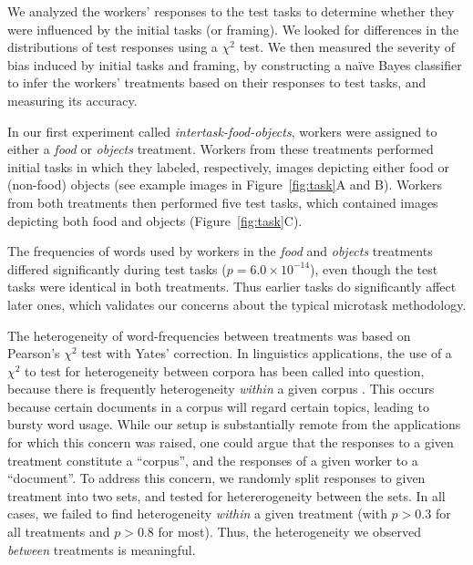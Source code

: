 \documentclass{sigchi}
\begin{document}
We analyzed the
workers' responses to the test tasks to determine whether
they were influenced by the initial tasks (or framing).  We looked for 
differences in the distributions of test responses 
using a $\chi^2$ test.  We then measured the 
severity of bias induced by initial tasks and framing, by 
constructing a na\"ive Bayes classifier to infer the workers' 
treatments based on their responses to test tasks, 
and measuring its accuracy.

In our first experiment called \textit{intertask-food-objects},
workers were assigned to either a \textit{food} or \textit{objects} 
treatment.  Workers from these treatments performed initial tasks 
in which they labeled, respectively, 
images depicting either food or (non-food) objects
(see example images in Figure~\ref{fig:task}A and B).  
Workers from both treatments then performed five test tasks, which
contained images
depicting both food and objects (Figure~\ref{fig:task}C).  

The frequencies of words used by
workers in the \textit{food} and \textit{objects} treatments differed
significantly during test tasks ($p = 6.0 \times 10^{-14}$),
even though the test tasks were identical in both treatments.  
Thus earlier tasks do significantly affect later ones, which 
validates our concerns about the typical microtask methodology.

The heterogeneity of word-frequencies between treatments was based on 
Pearson's $\chi^2$ test with Yates' correction.
In linguistics applications, the use of a $\chi^2$ to test for 
heterogeneity between corpora has been called
into question, because there is frequently heterogeneity \textit{within}
a given corpus \cite{kilgarriff1996comparing}.
This occurs because certain documents in a corpus will regard certain 
topics, leading to bursty word usage.  While our setup is substantially
remote from the applications for which this concern was raised, 
one could argue that the responses to a given treatment
constitute a ``corpus'', and the responses of a given worker to a 
``document''.
To address this concern, we randomly split responses to given treatment
into two sets, and tested for hetererogeneity between the sets.
In all cases, we failed to find heterogeneity \textit{within} a given 
treatment (with $p > 0.3$ for all treatments and $p > 0.8$ for most).
Thus, the heterogeneity we observed \textit{between} treatments is 
meaningful.
\end{document}
